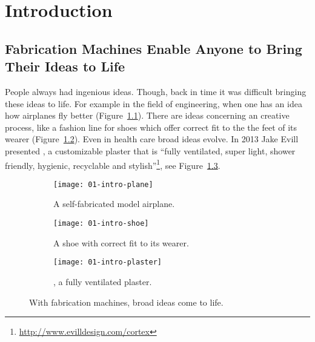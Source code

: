 \documentclass[../ClassicThesis.tex]{subfiles}
\begin{document}
\chapter{Introduction}
\label{ch:introduction}

\section{Fabrication Machines Enable Anyone to Bring Their Ideas to Life}
\label{sec:introduction}


People always had ingenious ideas. Though, back in time it was
difficult bringing these ideas to life. For example in the field of
engineering, when one has an idea how airplanes fly better
(Figure~\ref{fig:intro-ideas:plane}). There are ideas concerning an
creative process, like a fashion line for shoes which offer correct
fit to the the feet of its wearer (Figure~\ref{fig:intro-ideas:shoe}).
Even in health care broad ideas evolve. In 2013 Jake Evill presented
, a customizable plaster that is \enquote{fully
  ventilated, super light, shower friendly, hygienic, recyclable and
  stylish}\footnote{\url{http://www.evilldesign.com/cortex}}, see
Figure~\ref{fig:intro-ideas:plaster}. 

\begin{figure}[h]
  \centering
  \begin{subfigure}[b]{0.321\textwidth}
    \centering
    \texttt{[image: 01-intro-plane]}
    \caption{A self-fabricated model airplane.}
    \label{fig:intro-ideas:plane}
  \end{subfigure}
  \begin{subfigure}[b]{0.321\textwidth}
    \centering
    \texttt{[image: 01-intro-shoe]}
    \caption{A shoe with correct fit to its wearer.}
    \label{fig:intro-ideas:shoe}
  \end{subfigure}
  \begin{subfigure}[c]{0.321\textwidth}
    \centering
    \texttt{[image: 01-intro-plaster]}
    \caption{, a fully ventilated plaster.}
    \label{fig:intro-ideas:plaster}
  \end{subfigure}
  \caption{With fabrication machines, broad ideas come to life.}
  \label{fig:intro-ideas}
\end{figure}
\end{document}
